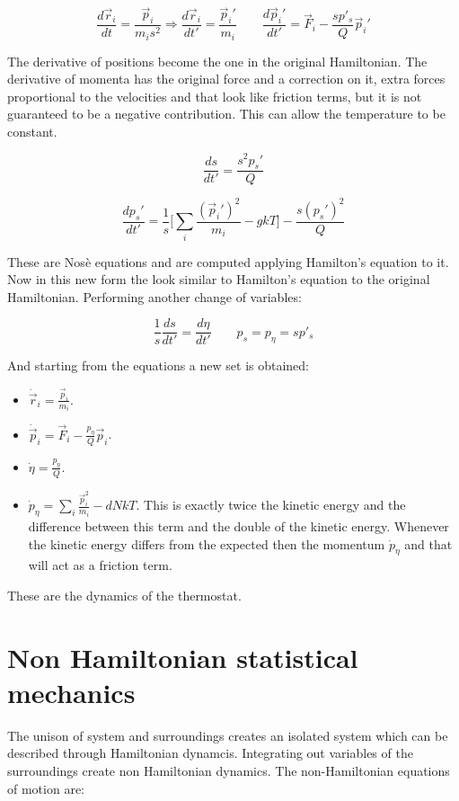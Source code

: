 	$$\frac{d\vec{r}_i}{dt} = \frac{\vec{p}_i}{m_is^2}\Rightarrow\frac{d\vec{r}_i}{dt'} = \frac{\vec{p}_i'}{m_i}\qquad \frac{d\vec{p}_i'}{dt'} = \vec{F}_i-\frac{sp'_s}{Q}\vec{p}_i'$$

	The derivative of positions become the one in the original Hamiltonian.
	The derivative of momenta has the original force and a correction on it, extra forces proportional to the velocities and that look like friction terms, but it is not guaranteed to be a negative contribution.
	This can allow the temperature to be constant.

	$$\frac{ds}{dt'} = \frac{s^2p_s'}{Q}$$

	$$\frac{dp_s'}{dt'} = \frac{1}{s}\biggl[\sum\limits_{i} \frac{(\vec{p}_i')^2}{m_i}-gkT\biggr] - \frac{s(p_s')^2}{Q}$$

	These are Nos\`e equations and are computed applying Hamilton's equation to it.
	Now in this new form the look similar to Hamilton's equation to the original Hamiltonian.
	Performing another change of variables:

	$$\frac{1}{s}\frac{ds}{dt'} = \frac{d\eta}{dt'}\qquad p_s = p_\eta = sp'_s$$

	And starting from the equations a new set is obtained:

	\begin{multicols}{2}
		\begin{itemize}
			\item $\dot{\vec{r}}_i = \frac{\vec{p}_i}{m_i}$.
			\item $\dot{\vec{p}}_i = \vec{F}_i-\frac{p_\eta}{Q}\vec{p}_i$.
			\item $\dot{\eta} = \frac{p_\eta}{Q}$.
			\item $\dot{p}_\eta = \sum\limits_{i}\frac{\vec{p}_i^2}{m_i}-dNkT$.
				This is exactly twice the kinetic energy and the difference between this term and the double of the kinetic energy.
				Whenever the kinetic energy differs from the expected then the momentum $\dot{p}_\eta$ and that will act as a friction term.
		\end{itemize}
	\end{multicols}

These are the dynamics of the thermostat.

\section{Non Hamiltonian statistical mechanics}
The unison of system and surroundings creates an isolated system which can be described through Hamiltonian dynamcis.
Integrating out variables of the surroundings create non Hamiltonian dynamics.
The non-Hamiltonian equations of motion are:

